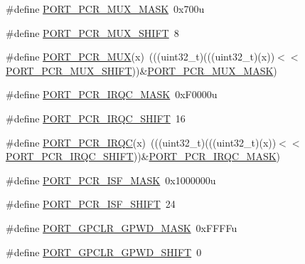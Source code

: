 \begin{DoxyCompactItemize}
\item 
\#define \hyperlink{group___p_o_r_t___register___masks_ga0feec5fc6b285b83c573f913c74e5c41}{P\+O\+R\+T\+\_\+\+P\+C\+R\+\_\+\+M\+U\+X\+\_\+\+M\+A\+SK}~0x700u
\item 
\#define \hyperlink{group___p_o_r_t___register___masks_gaa39e1cfed4df3797e4f1d141adab8776}{P\+O\+R\+T\+\_\+\+P\+C\+R\+\_\+\+M\+U\+X\+\_\+\+S\+H\+I\+FT}~8
\item 
\#define \hyperlink{group___p_o_r_t___register___masks_ga13b6c873e0e5385583b1f7907a9f796a}{P\+O\+R\+T\+\_\+\+P\+C\+R\+\_\+\+M\+UX}(x)~(((uint32\+\_\+t)(((uint32\+\_\+t)(x))$<$$<$\hyperlink{group___p_o_r_t___register___masks_gaa39e1cfed4df3797e4f1d141adab8776}{P\+O\+R\+T\+\_\+\+P\+C\+R\+\_\+\+M\+U\+X\+\_\+\+S\+H\+I\+FT}))\&\hyperlink{group___p_o_r_t___register___masks_ga0feec5fc6b285b83c573f913c74e5c41}{P\+O\+R\+T\+\_\+\+P\+C\+R\+\_\+\+M\+U\+X\+\_\+\+M\+A\+SK})
\item 
\#define \hyperlink{group___p_o_r_t___register___masks_gabaef70d886fda0a7da8e862308bf5909}{P\+O\+R\+T\+\_\+\+P\+C\+R\+\_\+\+I\+R\+Q\+C\+\_\+\+M\+A\+SK}~0x\+F0000u
\item 
\#define \hyperlink{group___p_o_r_t___register___masks_ga0bda43cd85ca4d5df17f12a193937d81}{P\+O\+R\+T\+\_\+\+P\+C\+R\+\_\+\+I\+R\+Q\+C\+\_\+\+S\+H\+I\+FT}~16
\item 
\#define \hyperlink{group___p_o_r_t___register___masks_ga7e6b6f68db9e76cf6fa34774c9b9b8f9}{P\+O\+R\+T\+\_\+\+P\+C\+R\+\_\+\+I\+R\+QC}(x)~(((uint32\+\_\+t)(((uint32\+\_\+t)(x))$<$$<$\hyperlink{group___p_o_r_t___register___masks_ga0bda43cd85ca4d5df17f12a193937d81}{P\+O\+R\+T\+\_\+\+P\+C\+R\+\_\+\+I\+R\+Q\+C\+\_\+\+S\+H\+I\+FT}))\&\hyperlink{group___p_o_r_t___register___masks_gabaef70d886fda0a7da8e862308bf5909}{P\+O\+R\+T\+\_\+\+P\+C\+R\+\_\+\+I\+R\+Q\+C\+\_\+\+M\+A\+SK})
\item 
\#define \hyperlink{group___p_o_r_t___register___masks_ga154d9308c2ab5b6a78ab04d9f3b08879}{P\+O\+R\+T\+\_\+\+P\+C\+R\+\_\+\+I\+S\+F\+\_\+\+M\+A\+SK}~0x1000000u
\item 
\#define \hyperlink{group___p_o_r_t___register___masks_ga5fbf95753704fb1d71da88299c11105e}{P\+O\+R\+T\+\_\+\+P\+C\+R\+\_\+\+I\+S\+F\+\_\+\+S\+H\+I\+FT}~24
\item 
\#define \hyperlink{group___p_o_r_t___register___masks_gaa7e4a890e9d09d85279889ce3ecb0044}{P\+O\+R\+T\+\_\+\+G\+P\+C\+L\+R\+\_\+\+G\+P\+W\+D\+\_\+\+M\+A\+SK}~0x\+F\+F\+F\+Fu
\item 
\#define \hyperlink{group___p_o_r_t___register___masks_gaafacaac0aa215f596b947609857d6491}{P\+O\+R\+T\+\_\+\+G\+P\+C\+L\+R\+\_\+\+G\+P\+W\+D\+\_\+\+S\+H\+I\+FT}~0

\end{DoxyCompactItemize}
